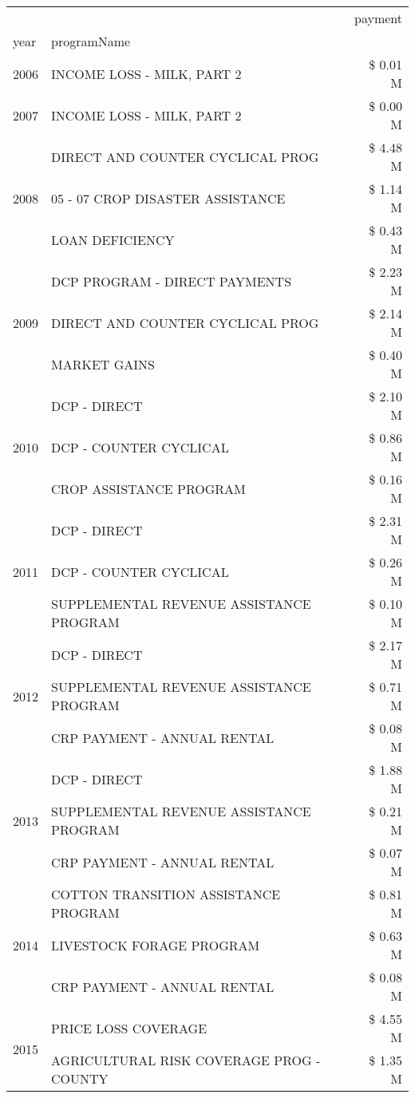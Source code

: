 \begin{tabular}{llr}
\toprule
 &  & payment \\
year & programName &  \\
\midrule
2006 & INCOME LOSS - MILK, PART 2 & \$ 0.01 M \\
\cline{1-3}
2007 & INCOME LOSS - MILK, PART 2 & \$ 0.00 M \\
\cline{1-3}
\multirow[t]{3}{*}{2008} & DIRECT AND COUNTER CYCLICAL PROG & \$ 4.48 M \\
 & 05 - 07 CROP DISASTER ASSISTANCE & \$ 1.14 M \\
 & LOAN DEFICIENCY & \$ 0.43 M \\
\cline{1-3}
\multirow[t]{3}{*}{2009} & DCP PROGRAM - DIRECT PAYMENTS & \$ 2.23 M \\
 & DIRECT AND COUNTER CYCLICAL PROG & \$ 2.14 M \\
 & MARKET GAINS & \$ 0.40 M \\
\cline{1-3}
\multirow[t]{3}{*}{2010} & DCP - DIRECT & \$ 2.10 M \\
 & DCP - COUNTER CYCLICAL & \$ 0.86 M \\
 & CROP ASSISTANCE PROGRAM & \$ 0.16 M \\
\cline{1-3}
\multirow[t]{3}{*}{2011} & DCP - DIRECT & \$ 2.31 M \\
 & DCP - COUNTER CYCLICAL & \$ 0.26 M \\
 & SUPPLEMENTAL REVENUE ASSISTANCE PROGRAM & \$ 0.10 M \\
\cline{1-3}
\multirow[t]{3}{*}{2012} & DCP - DIRECT & \$ 2.17 M \\
 & SUPPLEMENTAL REVENUE ASSISTANCE PROGRAM & \$ 0.71 M \\
 & CRP PAYMENT - ANNUAL RENTAL & \$ 0.08 M \\
\cline{1-3}
\multirow[t]{3}{*}{2013} & DCP - DIRECT & \$ 1.88 M \\
 & SUPPLEMENTAL REVENUE ASSISTANCE PROGRAM & \$ 0.21 M \\
 & CRP PAYMENT - ANNUAL RENTAL & \$ 0.07 M \\
\cline{1-3}
\multirow[t]{3}{*}{2014} & COTTON TRANSITION ASSISTANCE PROGRAM & \$ 0.81 M \\
 & LIVESTOCK FORAGE PROGRAM & \$ 0.63 M \\
 & CRP PAYMENT - ANNUAL RENTAL & \$ 0.08 M \\
\cline{1-3}
\multirow[t]{3}{*}{2015} & PRICE LOSS COVERAGE & \$ 4.55 M \\
 & AGRICULTURAL RISK COVERAGE PROG - COUNTY & \$ 1.35 M \\

\end{tabular}
